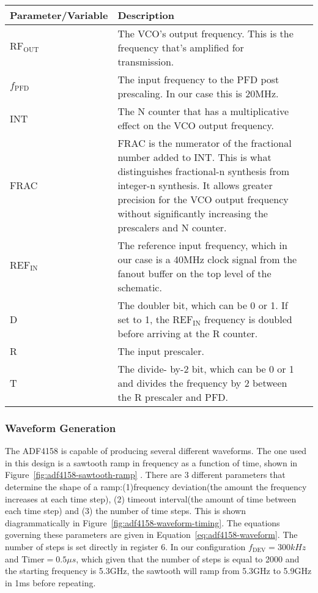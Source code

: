 \documentclass{default}
\begin{document}
\label{tab:adf4158-rfout-equation-vars}
\begin{tabularx}{\textwidth}{l X>{\raggedright\arraybackslash}X}
  \toprule
  \textbf{Parameter/Variable} & \textbf{Description} \\
  \midrule
  \endhead

  $\text{RF}_{\text{OUT}}$ & The VCO's output frequency. This is the frequency that's amplified for
  transmission. \\
  $f_{\text{PFD}}$ & The input frequency to the PFD post prescaling. In our case this is 20MHz. \\
  INT & The N counter that has a multiplicative effect on the VCO output frequency. \\
  FRAC & FRAC is the numerator of the fractional number added to INT. This is what distinguishes
  fractional-n synthesis from integer-n synthesis. It allows greater precision for the VCO
  output frequency without significantly increasing the prescalers and N counter. \\
  $\text{REF}_{\text{IN}} $ & The reference input frequency, which in our case is a 40MHz clock
  signal from the fanout buffer on the top level of the schematic. \\
  D & The doubler bit, which can be 0 or 1. If set to 1, the $\text{REF}_{\text{IN}}$ frequency is
  doubled before arriving at the R counter. \\
  R & The input prescaler. \\
  T & The divide- by-2 bit, which can be 0 or 1 and divides the frequency by 2 between the R
  prescaler and PFD. \\

  \bottomrule
\end{tabularx}

\subsubsection{Waveform Generation}
\label{sec:adf4158-waveform-generation}

The ADF4158 is capable of producing several different waveforms. The one used in this design is a
sawtooth ramp in frequency as a function of time, shown in Figure~\ref{fig:adf4158-sawtooth-ramp}
. There are 3 different parameters that determine the shape of a ramp:(1)frequency deviation(the
amount the frequency increases at each time step), (2) timeout interval(the amount of time between
each time step) and (3) the number of time steps. This is shown diagrammatically in
Figure~\ref{fig:adf4158-waveform-timing}. The equations governing these parameters are given in
Equation~\ref{eq:adf4158-waveform}. The number of steps is set directly in register 6. In our
configuration $f_{\text{DEV}} = 300\si{kHz}$ and $\text{Timer} = 0.5\si{\mu s}$, which given that
the number of steps is equal to 2000 and the starting frequency is 5.3GHz, the sawtooth will ramp
from 5.3GHz to 5.9GHz in 1ms before repeating.
\end{document}
